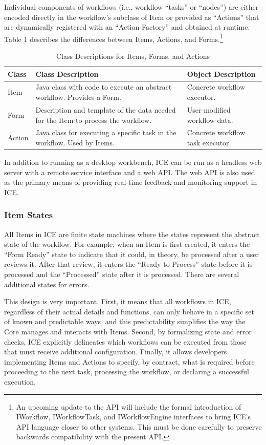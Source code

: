 Individual components of workflows (i.e., workflow ``tasks'' or
``nodes'') are either encoded directly in the workflow's subclass of
Item or provided as ``Actions'' that are dynamically registered with
an ``Action Factory'' and obtained at runtime. Table 1 describes the
differences between Items, Actions, and Forms.\footnote{An upcoming 
update to the API will include the formal introduction of
IWorkflow, IWorkflowTask, and IWorkflowEngine interfaces to bring ICE's
API language closer to other systems. This must be done carefully to
preserve backwards compatibility with the present API.}

\begin{table}[t]
\begin{tabularx}{\textwidth}{|l|X|l|}
\hline
Class & Class Description & Object Description\tabularnewline\hline
Item & Java class with code to execute an abstract workflow. Provides a
Form. & Concrete workflow executor.\tabularnewline\hline
Form & Description and template of the data needed for the Item to
process the workflow. & User-modified workflow data.\tabularnewline\hline
Action & Java class for executing a specific task in the workflow. Used
by Items. & Concrete workflow task executor.\tabularnewline\hline
\end{tabularx}
\caption{Class Descriptions for Items, Forms, and Actions}
\end{table}

In addition to running as a desktop workbench, ICE can be run as a
headless web server with a remote service interface and a web
API. The web API is also used as the primary means of providing real-time 
feedback and monitoring support in ICE.

\subsubsection{Item States}\label{item-states}

All Items in ICE are finite state machines where the states represent
the abstract state of the workflow. For example, when an Item is first
created, it enters the ``Form Ready'' state to indicate that it could,
in theory, be processed after a user reviews it. After that review, it
enters the ``Ready to Process'' state before it is processed and 
the ``Processed'' state after it is processed. There are several additional 
states for errors.

This design is very important. First, it means that all workflows in
ICE, regardless of their actual details and functions, can only behave in
a specific set of known and predictable ways, and this predictability 
simplifies the way the Core manages and interacts with Items. Second, by
formalizing state and error checks, ICE explicitly delineates which workflows 
can be executed from those that must receive additional configuration. 
Finally, it allows developers implementing Items and
Actions to specify, by contract, what is required before proceeding to the
next task, processing the workflow, or declaring a successful execution.

